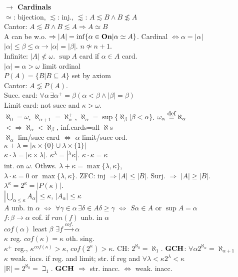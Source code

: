 \documentclass[9pt]{article}
\newcommand{\class}[1]{{\bf #1}}
\newcommand{\R}{\mathbb{R}}
\newcommand{\eqdef}{\overset{\mbox{\small{def}}}{=}}
\newcommand{\mytitle}[1]{ {\bf $\rightarrow$ #1}\\}
\newcommand{\On}{\class{On}}
\begin{document}
\begin{multicols*}{2}
\mytitle{Cardinals}
$\simeq$: bijection, $\lesssim$: inj., $\lnsim$: $A\lesssim B\wedge B\not\lesssim A$\\
Cantor: $A\lesssim B\wedge B\lesssim A\Rightarrow A\simeq B$\\
A can be w.o. $\Rightarrow|A|=\inf\{\alpha\in \On|\alpha\simeq A\}$. Cardinal $\Leftrightarrow \alpha=|\alpha|$\\
$|\alpha|\leqslant \beta\leqslant \alpha\rightarrow |\alpha|=|\beta|$. $n\not\simeq n+1$.\\
Infinite: $|A|\not<\omega$. $\sup A$ card if $\alpha\in A$ card.\\
$|\alpha|=\alpha>\omega$ limit ordinal\\
$P(A)=\{B|B\subseteq A\}$ set by axiom\\
Cantor: $A\lnsim P(A)$.\\
Succ. card: $\forall\alpha\,\exists\alpha^+=\beta(\alpha<\beta\wedge|\beta|=\beta)$\\
Limit card: not succ and $\kappa>\omega$.\\
$\aleph_0=\omega$, $\aleph_{\alpha+1}=\aleph_{\alpha}^+$, $\aleph_\alpha=\sup\{\aleph_{\beta}|\beta<\alpha\}$. $\omega_\alpha\eqdef\aleph_\alpha$\\
$<\Rightarrow\aleph_\alpha<\aleph_\beta$, inf.cards=all $\aleph$s\\
$\aleph_\alpha$ lim/succ card $\Leftrightarrow$ $\alpha$ limit/succ ord.\\
$\kappa+\lambda=|\kappa\times\{0\}\cup\lambda\times\{1\}|$\\
$\kappa\cdot\lambda=|\kappa\times\lambda|$. $\kappa^\lambda=|^\lambda\kappa|$. $\kappa\cdot\kappa=\kappa$\\
int. on $\omega$. Othws. $\lambda+\kappa=\max\{\lambda,\kappa\}$,\\
$\lambda\cdot \kappa=0$ or $\max\{\lambda,\kappa\}$.
ZFC: inj $\Rightarrow |A|\leqslant |B|$. Surj. $\Rightarrow$ $|A|\geqslant |B|$.\\
$\lambda^\kappa=2^\kappa=|P(\kappa)|$.\\
$|\bigcup\limits_{\alpha\leqslant \kappa}A_\alpha|\leqslant\kappa$, $|A_\alpha|\leqslant\kappa$\\
$A$ unb. in $\alpha$ $\Leftrightarrow$ $\forall\gamma\in\alpha\,\exists\delta\in A\delta\geqslant\gamma$ $\Leftrightarrow$ $S\alpha\in A$ or $\sup A=\alpha$\\
$f\colon\beta\to\alpha$ cof. if $ran(f)$ unb. in $\alpha$\\
$cof(\alpha)$ least $\beta$ $\exists f\overset{cof.}{\to}\alpha$\\
$\kappa$ reg. $cof(\kappa)=\kappa$ oth. sing.\\
$\kappa^+$ reg., $\kappa^{cof(\kappa)}>\kappa$, $cof(2^\kappa)>\kappa$.
CH: $2^{\aleph_0}=\aleph_1$. $\class{GCH}$: $\forall\alpha 2^{\aleph_\alpha}=\aleph_{\alpha+1}$\\
$\kappa$ weak. incs. if reg. and limit; str. if reg and $\forall\lambda<\kappa 2^\lambda<\kappa$\\
$|\R|=2^{\aleph_0}=\beth_1$. $\class{GCH}$ $\Rightarrow$ str. inacc. $\Leftrightarrow$ weak. inacc.


\end{multicols*}
\end{document}
